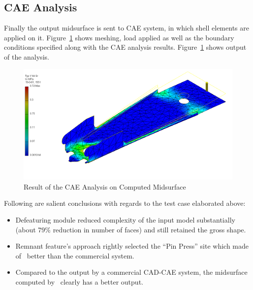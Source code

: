 \subsection{CAE Analysis}

Finally the output midsurface is sent to CAE system, in which shell elements are applied on it. Figure~\ref{fig:results:staplerlowercae} shows meshing, load applied as well as the boundary conditions specified along with the CAE analysis results. Figure~\ref{fig:results:staplerlowercae} shows output of the analysis.



\begin{figure}[!h]
\centering     %
\includegraphics[width=0.62\linewidth,valign=t]{../Common/images/StaplerLower_cae_model}
\caption{Result of the CAE Analysis on Computed Midsurface}
\label{fig:results:staplerlowercae}
\end{figure}


Following are salient conclusions with regards to the test case elaborated above:

\begin{itemize}[noitemsep,topsep=2pt,parsep=2pt,partopsep=2pt]
\item Defeaturing module reduced complexity of the input model substantially (about 79\% reduction in number of faces) and still retained the gross shape. 
\item Remnant feature's approach rightly selected the ``Pin Press'' site which made  of \mysystemname~better than the commercial system.
\item Compared to the output by a commercial CAD-CAE system, the midsurface computed by \mysystemname~clearly has a better output.
\end{itemize}



